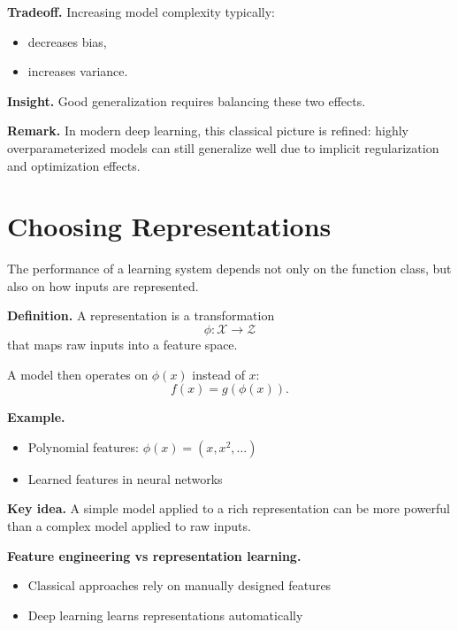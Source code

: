 \medskip

\noindent
\textbf{Tradeoff.}  
Increasing model complexity typically:
\begin{itemize}
    \item decreases bias,
    \item increases variance.
\end{itemize}

\medskip

\noindent
\textbf{Insight.}  
Good generalization requires balancing these two effects.

\medskip

\noindent
\textbf{Remark.}  
In modern deep learning, this classical picture is refined: highly overparameterized models can still generalize well due to implicit regularization and optimization effects.

\section{Choosing Representations}

The performance of a learning system depends not only on the function class, but also on how inputs are represented.

\medskip

\noindent
\textbf{Definition.}  
A representation is a transformation
\[
\phi : \mathcal{X} \to \mathcal{Z}
\]
that maps raw inputs into a feature space.

\medskip

A model then operates on $\phi(x)$ instead of $x$:
\[
f(x) = g(\phi(x)).
\]

\medskip

\noindent
\textbf{Example.}
\begin{itemize}
    \item Polynomial features: $\phi(x) = (x, x^2, \dots)$
    \item Learned features in neural networks
\end{itemize}

\medskip

\noindent
\textbf{Key idea.}  
A simple model applied to a rich representation can be more powerful than a complex model applied to raw inputs.

\medskip

\noindent
\textbf{Feature engineering vs representation learning.}

\begin{itemize}
    \item Classical approaches rely on manually designed features
    \item Deep learning learns representations automatically
\end{itemize}

